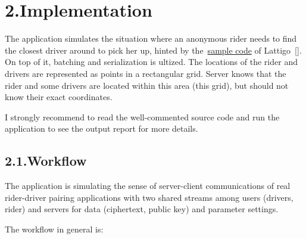 \documentclass[12pt]{article}
\begin{document}
\section{2.\hspace*{0.5em}Implementation}\label{sec-implementation}%

\noindent{}The application simulates the situation where an anonymous rider needs to find the closest driver around to pick her up, hinted by the~\href{https://github.com/ldsec/lattigo/blob/master/examples/bfv/main.go}{sample code} of Lattigo~[]. On top of it, batching and serialization is ultized. The locations of the rider and drivers are represented as points in a rectangular grid. Server knows that the rider and some drivers are located within this area (this grid), but should not know their exact coordinates.%

I strongly recommend to read the well-commented source code and run the application to see the output report for more details.%

\subsection{2.1.\hspace*{0.5em}Workflow}\label{sec-workflow}%

\noindent{}The application is simulating the sense of server-client communications of real rider-driver pairing applications with two shared streams among users (drivers, rider) and servers for data (ciphertext, public key) and parameter settings.%

The workflow in general is:%
\end{document}
